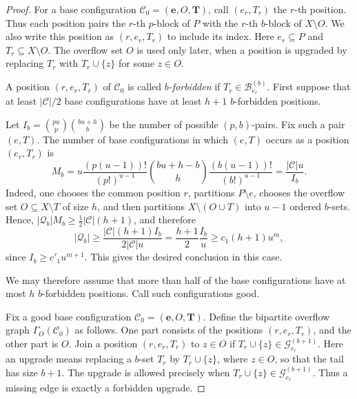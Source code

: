 \documentclass[10pt,a4paper]{article}
\numberwithin{equation}{section}
\theoremstyle{definition}
\newcommand{\G}{\mathcal G}
\begin{document}
\begin{proof}
        For a base configuration $\mathcal C_0=(\mathbf e,O,\mathbf T)$, call $(e_r,T_r)$ the $r$-th position.
        Thus each position pairs the $r$-th $p$-block of $P$ with the $r$-th $b$-block of $X\setminus O$.
        We also write this position as $(r,e_r,T_r)$ to include its index.
        Here $e_r\subseteq P$ and $T_r\subseteq X\setminus O$.
        The overflow set $O$ is used only later, when a position is upgraded by replacing $T_r$ with $T_r\cup\{z\}$ for some $z\in O$.

        A position $(r,e_r,T_r)$ of $\mathcal C_0$ is called \emph{$b$-forbidden} if $T_r\in\mathcal B_{e_r}^{(b)}$.
        First suppose that at least $|\mathcal C|/2$ base configurations have at least $h+1$ $b$-forbidden positions.

        Let $I_b=\binom{pu}{p}\binom{bu+h}{b}$ be the number of possible $(p,b)$-pairs.
        Fix such a pair $(e,T)$. The number of base configurations in which $(e,T)$ occurs as a position $(e_r,T_r)$ is
        \[
                M_b
                =
                u\frac{(p(u-1))!}{(p!)^{u-1}}\binom{bu+h-b}{h}\frac{(b(u-1))!}{(b!)^{u-1}}
                =
                \frac{|\mathcal C|u}{I_b}.
        \]
        Indeed, one chooses the common position $r$, partitions $P\setminus e$, chooses the overflow set $O\subseteq X\setminus T$ of size $h$, and then partitions $X\setminus(O\cup T)$ into $u-1$ ordered $b$-sets.
        Hence, $|\mathcal Q_b|M_b\ge\frac12|\mathcal C|(h+1)$, and therefore
        \[
                |\mathcal Q_b|
                \ge
                \frac{|\mathcal C|(h+1)I_b}{2|\mathcal C|u}
                =
                \frac{h+1}{2}\frac{I_b}{u}
                \ge
                c_1(h+1)u^m,
        \]
        since $I_b\ge c'_1u^{m+1}$.
        This gives the desired conclusion in this case.

        We may therefore assume that more than half of the base configurations have at most $h$ $b$-forbidden positions.
        Call such configurations good.

        Fix a good base configuration $\mathcal C_0=(\mathbf e,O,\mathbf T)$.
        Define the bipartite overflow graph $\Gamma_O(\mathcal C_0)$ as follows.
        One part consists of the positions $(r,e_r,T_r)$, and the other part is $O$.
        Join a position $(r,e_r,T_r)$ to $z\in O$ if $T_r\cup\{z\}\in\G_{e_r}^{(b+1)}$.
        Here an upgrade means replacing a $b$-set $T_r$ by $T_r\cup\{z\}$, where $z\in O$, so that the tail has size $b+1$.
        The upgrade is allowed precisely when $T_r\cup\{z\}\in\G_{e_r}^{(b+1)}$.
        Thus a missing edge is exactly a forbidden upgrade.


\end{proof}
\end{document}

